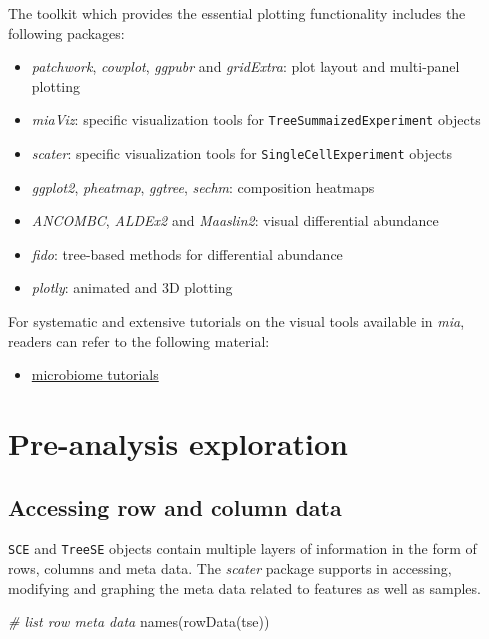 \documentclass[
]{book}
\newenvironment{Shaded}{\begin{snugshade}}{\end{snugshade}}
\newcommand{\CommentTok}[1]{\textcolor[rgb]{0.56,0.35,0.01}{\textit{#1}}}
\newcommand{\FunctionTok}[1]{\textcolor[rgb]{0.00,0.00,0.00}{#1}}
\newcommand{\NormalTok}[1]{#1}
\providecommand{\tightlist}{%
  \setlength{\itemsep}{0pt}\setlength{\parskip}{0pt}}
\begin{document}
The toolkit which provides the essential plotting functionality
includes the following packages:

\begin{itemize}
\tightlist
\item
  \emph{patchwork}, \emph{cowplot}, \emph{ggpubr} and \emph{gridExtra}: plot layout and multi-panel plotting
\item
  \emph{miaViz}: specific visualization tools for \texttt{TreeSummaizedExperiment} objects
\item
  \emph{scater}: specific visualization tools for \texttt{SingleCellExperiment} objects
\item
  \emph{ggplot2}, \emph{pheatmap}, \emph{ggtree}, \emph{sechm}: composition heatmaps
\item
  \emph{ANCOMBC}, \emph{ALDEx2} and \emph{Maaslin2}: visual differential abundance
\item
  \emph{fido}: tree-based methods for differential abundance
\item
  \emph{plotly}: animated and 3D plotting
\end{itemize}

For systematic and extensive tutorials on the visual tools available
in \emph{mia}, readers can refer to the following material:

\begin{itemize}
\tightlist
\item
  \href{https://microbiome.github.io/tutorials/}{microbiome tutorials}
\end{itemize}

\hypertarget{pre-analysis-exploration}{%
\section{Pre-analysis exploration}\label{pre-analysis-exploration}}

\hypertarget{accessing-row-and-column-data}{%
\subsection{Accessing row and column data}\label{accessing-row-and-column-data}}

\texttt{SCE} and \texttt{TreeSE} objects contain multiple layers of information in the
form of rows, columns and meta data. The \emph{scater} package supports in
accessing, modifying and graphing the meta data related to features as
well as samples.

\begin{Shaded}
\begin{Highlighting}[]
\CommentTok{\# list row meta data}
\FunctionTok{names}\NormalTok{(}\FunctionTok{rowData}\NormalTok{(tse))}
\end{Highlighting}
\end{Shaded}
\end{document}

